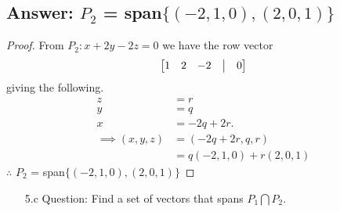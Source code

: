 \documentclass[12pt]{article}
\begin{document}
\subsection{Answer: $P_2$ = span$\{(-2, 1, 0), (2, 0, 1)\}$}
\begin{proof} From $P_2: x + 2y - 2z = 0$ we have the row vector
        \begin{align*}
                \begin{bmatrix}
                        1 & 2 & -2 & \bigm| & 0
                \end{bmatrix}
        \end{align*}
        giving the following.
        \begin{align*}
                z                & =r                         \\
                y                & =q                         \\
                x                & =-2q + 2r.                 \\
                \implies (x,y,z) & = (-2q + 2r, q, r)         \\
                                 & = q(-2, 1, 0) + r(2, 0, 1)
        \end{align*}
        $\therefore$ $P_2$ = span$\{(-2, 1, 0), (2, 0, 1)\}$
\end{proof}
\pagebreak
\begin{enumerate}
        \item[5.c]Question: Find a set of vectors that spans $P_1 \bigcap P_2$.
\end{enumerate}
\end{document}
